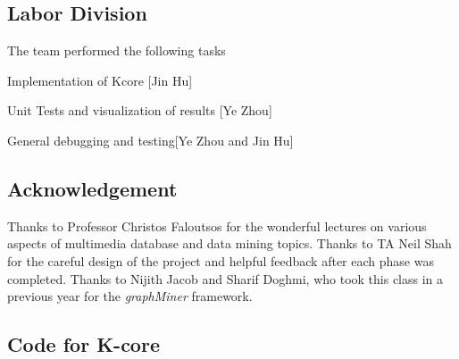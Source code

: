 
\subsection{Labor Division}

The team performed the following tasks
\bit
\item Implementation of Kcore [Jin Hu]
\item Unit Tests and visualization of results [Ye Zhou]
\item General debugging and testing[Ye Zhou and Jin Hu]
\eit


\subsection{Acknowledgement}

Thanks to Professor Christos Faloutsos for the wonderful lectures on various aspects of multimedia database and data mining topics. Thanks to TA Neil Shah for the careful design of the project and helpful feedback after each phase was completed. Thanks to Nijith Jacob and Sharif Doghmi, who took this class in a previous year for the {\em graphMiner} framework.


\subsection{Code for K-core}


